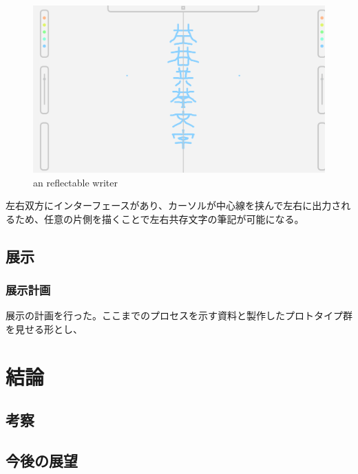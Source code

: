 \documentclass{jsarticle}
\begin{document}
\begin{figure}[H]
      \centering\includegraphics[width = 14cm]{./images/writer.png}
      \caption{an reflectable writer}\label{fig:writer}
\end{figure}

左右双方にインターフェースがあり、カーソルが中心線を挟んで左右に出力されるため、任意の片側を描くことで左右共存文字の筆記が可能になる。
\newpage
\subsection{展示}
\subsubsection{展示計画}
展示の計画を行った。ここまでのプロセスを示す資料と製作したプロトタイプ群を見せる形とし、

\newpage
\section{結論}
\subsection{考察}

\subsection{今後の展望}
\end{document}
